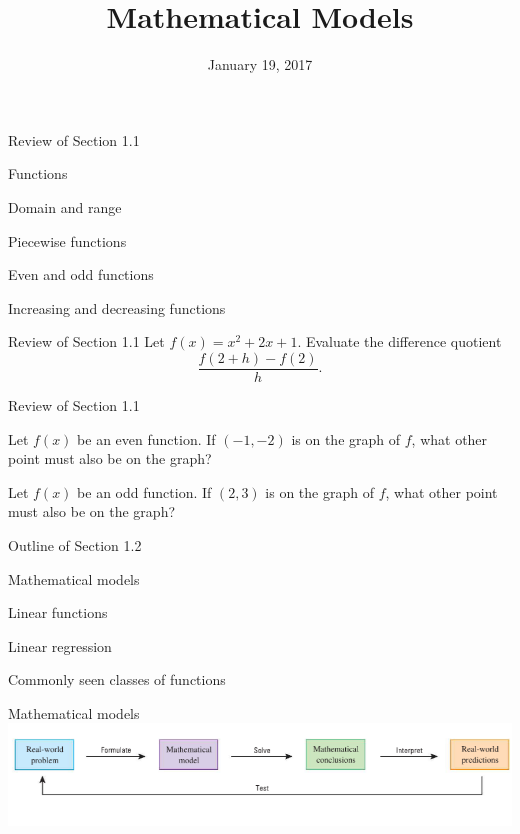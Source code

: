 \documentclass[t]{beamer}
\title{Mathematical Models}
\date{January 19, 2017}
\newenvironment{fpi}
  {\itemize[nolistsep,itemsep=\fill]}
  {\vfill\enditemize}
\begin{document}
\frame{\titlepage}


\begin{frame}{Review of Section 1.1}
\begin{fpi}
\item Functions
\item Domain and range
\item Piecewise functions
\item Even and odd functions
\item Increasing and decreasing functions
\end{fpi}
\end{frame}

\begin{frame}{Review of Section 1.1}
Let $\displaystyle f(x) = x^2 + 2x + 1$. Evaluate the difference quotient
$$\displaystyle \frac{f(2+h) - f(2)}{h}.$$
\end{frame}

\begin{frame}{Review of Section 1.1}
\begin{fpi}
\item Let $f(x)$ be an even function.  If $(-1,-2)$ is on the graph of $f$, what other point
must also be on the graph?
\item Let $f(x)$ be an odd function.  If $(2,3)$ is on the graph of $f$, what other point
must also be on the graph?
\end{fpi}
\end{frame}

\begin{frame}{Outline of Section 1.2}
\begin{fpi}
\item Mathematical models
\item Linear functions
\item Linear regression
\item Commonly seen classes of functions
\end{fpi}
\end{frame}

\begin{frame}{Mathematical models}
\vfill
\includegraphics[width=\textwidth]{mmodel}
\vfill
\end{frame}
\end{document}
